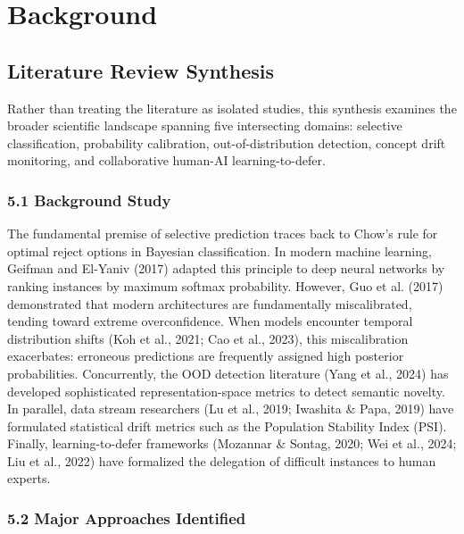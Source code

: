 \chapter{Background}

\section{Literature Review Synthesis}

Rather than treating the literature as isolated studies, this synthesis examines the broader scientific landscape spanning five intersecting domains: selective classification, probability calibration, out-of-distribution detection, concept drift monitoring, and collaborative human-AI learning-to-defer.

\subsection{5.1 Background Study}

The fundamental premise of selective prediction traces back to Chow's rule for optimal reject options in Bayesian classification. In modern machine learning, Geifman and El-Yaniv (2017) adapted this principle to deep neural networks by ranking instances by maximum softmax probability. However, Guo et al. (2017) demonstrated that modern architectures are fundamentally miscalibrated, tending toward extreme overconfidence. When models encounter temporal distribution shifts (Koh et al., 2021; Cao et al., 2023), this miscalibration exacerbates: erroneous predictions are frequently assigned high posterior probabilities. Concurrently, the OOD detection literature (Yang et al., 2024) has developed sophisticated representation-space metrics to detect semantic novelty. In parallel, data stream researchers (Lu et al., 2019; Iwashita \& Papa, 2019) have formulated statistical drift metrics such as the Population Stability Index (PSI). Finally, learning-to-defer frameworks (Mozannar \& Sontag, 2020; Wei et al., 2024; Liu et al., 2022) have formalized the delegation of difficult instances to human experts.

\subsection{5.2 Major Approaches Identified}

